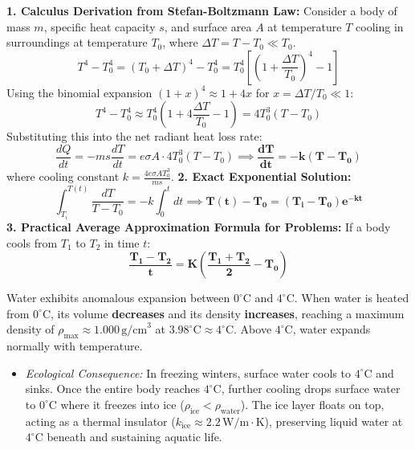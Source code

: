 \documentclass[10pt,twoside,openright]{book}
\begin{document}
\begin{formulabox}
\textbf{1. Calculus Derivation from Stefan-Boltzmann Law:}
Consider a body of mass $m$, specific heat capacity $s$, and surface area $A$ at temperature $T$ cooling in surroundings at temperature $T_0$, where $\Delta T = T - T_0 \ll T_0$.
\begin{equation}
  T^4 - T_0^4 = (T_0 + \Delta T)^4 - T_0^4 = T_0^4 \left[\left(1 + \frac{\Delta T}{T_0}\right)^4 - 1\right]
\end{equation}
Using the binomial expansion $(1 + x)^4 \approx 1 + 4x$ for $x = \Delta T / T_0 \ll 1$:
\begin{equation}
  T^4 - T_0^4 \approx T_0^4 \left(1 + 4\frac{\Delta T}{T_0} - 1\right) = 4 T_0^3 (T - T_0)
\end{equation}
Substituting this into the net radiant heat loss rate:
\begin{equation}
  \frac{dQ}{dt} = -m s \frac{dT}{dt} = e \sigma A \cdot 4 T_0^3 (T - T_0) \implies \mathbf{\frac{dT}{dt} = -k (T - T_0)}
\end{equation}
where cooling constant $k = \frac{4 e \sigma A T_0^3}{m s}$.
\textbf{2. Exact Exponential Solution:}
\begin{equation}
  \int_{T_i}^{T(t)} \frac{dT}{T - T_0} = -k \int_0^t dt \implies \mathbf{T(t) - T_0 = (T_i - T_0) e^{-k t}}
\end{equation}
\textbf{3. Practical Average Approximation Formula for Problems:}
If a body cools from $T_1$ to $T_2$ in time $t$:
\begin{equation}
  \mathbf{\frac{T_1 - T_2}{t} = K \left(\frac{T_1 + T_2}{2} - T_0\right)}
\end{equation}
\end{formulabox}

\begin{ncertbox}
Water exhibits anomalous expansion between $0^\circ\mathrm{C}$ and $4^\circ\mathrm{C}$. When water is heated from $0^\circ\mathrm{C}$, its volume \textbf{decreases} and its density \textbf{increases}, reaching a maximum density of $\rho_{\max} \approx 1.000\,\mathrm{g/cm}^3$ at $3.98^\circ\mathrm{C} \approx 4^\circ\mathrm{C}$. Above $4^\circ\mathrm{C}$, water expands normally with temperature.
\begin{itemize}
  \item \textit{Ecological Consequence:} In freezing winters, surface water cools to $4^\circ\mathrm{C}$ and sinks. Once the entire body reaches $4^\circ\mathrm{C}$, further cooling drops surface water to $0^\circ\mathrm{C}$ where it freezes into ice ($\rho_{\text{ice}} < \rho_{\text{water}}$). The ice layer floats on top, acting as a thermal insulator ($k_{\text{ice}} \approx 2.2\,\mathrm{W/m\cdot K}$), preserving liquid water at $4^\circ\mathrm{C}$ beneath and sustaining aquatic life.
\end{itemize}
\end{ncertbox}
\end{document}
